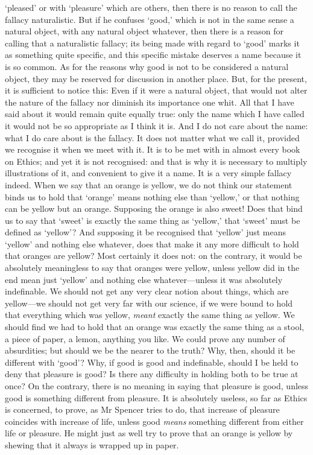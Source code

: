 `pleased' or with `pleasure' which are others, then there is no reason
to call the fallacy naturalistic. But if he confuses `good,' which
is not in the same sense a natural object, with any natural object
whatever, then there is a reason for calling that a naturalistic
fallacy; its being made with regard to `good' marks it as something
quite specific, and this specific mistake deserves a name because it
is so common.  As for the reasons why good is not to be
considered a natural object, they may be reserved for discussion in
another place. But, for the present, it is sufficient to notice
this: Even if it were a natural object, that would not alter the
nature of the fallacy nor diminish its importance one whit. All that I
have said about it would remain quite equally true: only the name
which I have called it would not be so appropriate as I think it is.
And I do not care about the name: what I do care about is the fallacy.
It does not matter what we call it, provided we recognise it when we
meet with it. It is to be met with in almost every book on Ethics; and
yet it is not recognised: and that is why it is necessary to multiply
illustrations of it, and convenient to give it a name. It is a very
simple fallacy indeed. When we say that an orange is yellow, we do not
think our statement binds us to hold that `orange' means nothing else
than `yellow,' or that nothing can be yellow but an orange. Supposing
the orange is also sweet! Does that bind us to say that `sweet' is
exactly the same thing as `yellow,' that `sweet' must be defined as
`yellow'? And supposing it be recognised that `yellow' just means
`yellow' and nothing else whatever, does that make it any more
difficult to hold that oranges are yellow? Most certainly it does not:
on the contrary, it would be absolutely meaningless to say that
oranges were yellow, unless yellow did in the end mean just `yellow'
and nothing else whatever---unless it was absolutely indefinable. We
should not get any very clear notion about things, which are
yellow---we should not get very far with our science, if we were bound
to hold that everything which was yellow, \textit{meant} exactly the
same thing as yellow. We should find we had to hold that an orange was
exactly the same thing as a stool, a piece of paper, a lemon, anything
you like. We could prove any number of absurdities; but should we be
the nearer to the truth? Why, then, should it be different with
`good'? Why, if good is good and indefinable, should I be held to deny
that pleasure is good? Is there any difficulty in holding both to be
true at once? On the contrary, there is no meaning in saying that
pleasure is good, unless good is something different from pleasure. It
is absolutely useless, so far as Ethics is concerned, to prove, as Mr
Spencer  tries to do, that increase of pleasure coincides
with increase of life, unless good \textit{means} something different
from either life or pleasure. He might just as well try to prove that
an orange is yellow by shewing that it always is wrapped up in
paper.

